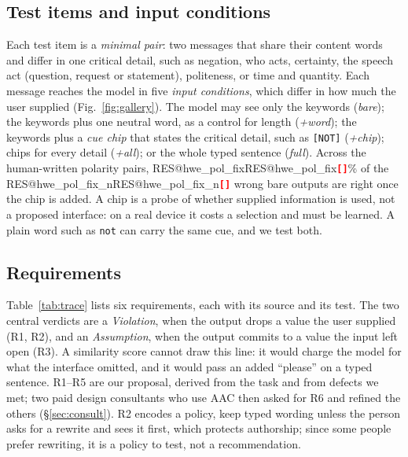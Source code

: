 \documentclass[conference,10pt]{IEEEtran}
\makeatletter
\newcommand{\RES}[1]{\ifcsname RES@#1\endcsname\csname RES@#1\endcsname\else\RESmissing{#1}\fi}
\newcommand{\RESmissing}[1]{\textcolor{red}{\textbf{\texttt{[\detokenize{#1}]}}}}
\newcommand{\chip}[1]{\texttt{[#1]}}
\newcommand{\kw}[1]{\texttt{#1}}
\newcommand{\say}[1]{``#1''}
\makeatother
\begin{document}
\subsection{Test items and input conditions}
Each test item is a \emph{minimal pair}: two messages that share their content words and differ in one critical detail, such as negation, who acts, certainty, the speech act (question, request or statement), politeness, or time and quantity.
Each message reaches the model in five \emph{input conditions}, which differ in how much the user supplied (Fig.~\ref{fig:gallery}).
The model may see only the keywords (\emph{bare}); the keywords plus one neutral word, as a control for length (\emph{+word}); the keywords plus a \emph{cue chip} that states the critical detail, such as \chip{NOT} (\emph{+chip}); chips for every detail (\emph{+all}); or the whole typed sentence (\emph{full}).
Across the human-written polarity pairs, \RES{hwe_pol_fix}\% of the \RES{hwe_pol_fix_n} wrong bare outputs are right once the chip is added.
A chip is a probe of whether supplied information is used, not a proposed interface: on a real device it costs a selection and must be learned.
A plain word such as \kw{not} can carry the same cue, and we test both.

\subsection{Requirements}
Table~\ref{tab:trace} lists six requirements, each with its source and its test.
The two central verdicts are a \emph{Violation}, when the output drops a value the user supplied (R1, R2), and an \emph{Assumption}, when the output commits to a value the input left open (R3).
A similarity score cannot draw this line: it would charge the model for what the interface omitted, and it would pass an added \say{please} on a typed sentence.
R1--R5 are our proposal, derived from the task and from defects we met; two paid design consultants who use AAC then asked for R6 and refined the others (\S\ref{sec:consult}).
R2 encodes a policy, keep typed wording unless the person asks for a rewrite and sees it first, which protects authorship; since some people prefer rewriting, it is a policy to test, not a recommendation.
\end{document}
